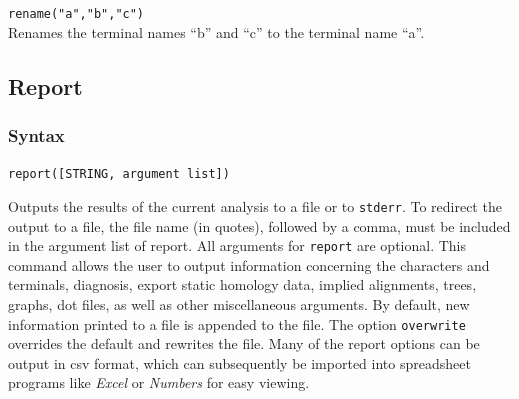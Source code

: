 	\begin{example}
		\item{\texttt{rename("a","b","c")}\\ Renames the terminal names ``b'' and ``c'' to 
		the terminal name ``a''. }
	\end{example}


\subsection{Report}
\label{subsec:report}
	\subsubsection{Syntax}
		\texttt{report([STRING, argument list])}
	
	\begin{phygdescription}
		{Outputs the results of the current analysis to a file or to \texttt{stderr}. To redirect the 
		output to a file, the file name (in quotes), followed by a comma, must be included in 
		the argument list of report. All arguments for \texttt{report} are optional. This command 
		allows the user to output information concerning the characters and terminals, 
		diagnosis, export static homology data, implied alignments, trees, graphs, dot files, 
		as well as other miscellaneous arguments. By default, new information printed to 
		a file is appended to the file. The option \texttt{overwrite} overrides the default and 
		rewrites the file. Many of the report options can be output in csv format,  which can
		subsequently be imported into spreadsheet programs like \textit{Excel} or 
		\textit{Numbers} for easy viewing.}
	\end{phygdescription}
	
